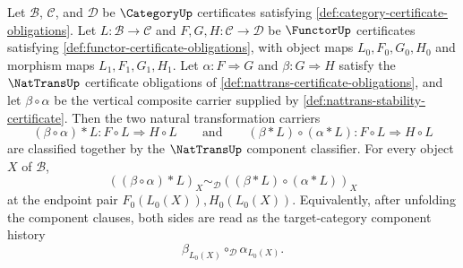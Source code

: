 \begin{theorem}
\label{thm:nattrans-prewhiskering-preserves-vertical-composition}
Let $\mathcal B$, $\mathcal C$, and $\mathcal D$ be $\CategoryUp$ certificates satisfying \autoref{def:category-certificate-obligations}. Let $L:\mathcal B\to\mathcal C$ and $F,G,H:\mathcal C\to\mathcal D$ be $\FunctorUp$ certificates satisfying \autoref{def:functor-certificate-obligations}, with object maps $L_0,F_0,G_0,H_0$ and morphism maps $L_1,F_1,G_1,H_1$. Let $\alpha:F\Rightarrow G$ and $\beta:G\Rightarrow H$ satisfy the $\NatTransUp$ certificate obligations of \autoref{def:nattrans-certificate-obligations}, and let $\beta\circ\alpha$ be the vertical composite carrier supplied by \autoref{def:nattrans-stability-certificate}. Then the two natural transformation carriers
$$
(\beta\circ\alpha)\ast L:F\circ L\Rightarrow H\circ L
\qquad\text{and}\qquad
(\beta\ast L)\circ(\alpha\ast L):F\circ L\Rightarrow H\circ L
$$
are classified together by the $\NatTransUp$ component classifier. For every object $X$ of $\mathcal B$,
$$
((\beta\circ\alpha)\ast L)_X
\sim_{\mathcal D}
((\beta\ast L)\circ(\alpha\ast L))_X
$$
at the endpoint pair $F_0(L_0(X)),H_0(L_0(X))$. Equivalently, after unfolding the component clauses, both sides are read as the target-category component history
$$
\beta_{L_0(X)}\circ_{\mathcal D}\alpha_{L_0(X)}.
$$
\end{theorem}
